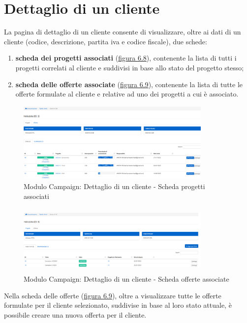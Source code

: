\section{Dettaglio di un cliente}
\noindent La pagina di dettaglio di un cliente consente di visualizzare, oltre ai dati di un cliente (codice, descrizione, partita iva e codice fiscale), due schede:
\begin{enumerate}
\item \textbf{scheda dei progetti associati} ({\hyperref[fig:dettaglioCliente1]{figura 6.8}}), contenente la lista di tutti i progetti correlati al cliente e suddivisi in base allo stato del progetto stesso;
\item \textbf{scheda delle offerte associate} ({\hyperref[fig:dettaglioCliente2]{figura 6.9}}), contenente la lista di tutte le offerte formulate al cliente e relative ad uno dei progetti a cui è associato.
\end{enumerate}

\begin{figure}[!h]
\centering
\includegraphics[width=360px, height=150px]{../images/UI/09-dettaglioClienteTab1.png}
\caption{Modulo Campaign: Dettaglio di un cliente - Scheda progetti associati}
\label{fig:dettaglioCliente1}
\end{figure} 

\pagebreak

\begin{figure}[!h]
\centering
\includegraphics[width=360px, height=130px]{../images/UI/09-dettaglioClienteTab2.png}
\caption{Modulo Campaign: Dettaglio di un cliente - Scheda offerte associate}
\label{fig:dettaglioCliente2}
\end{figure}

\noindent Nella scheda delle offerte ({\hyperref[fig:dettaglioCliente2]{figura 6.9}}), oltre a visualizzare tutte le offerte formulate per il cliente selezionato, suddivise in base al loro stato attuale, è possibile creare una nuova offerta per il cliente.


